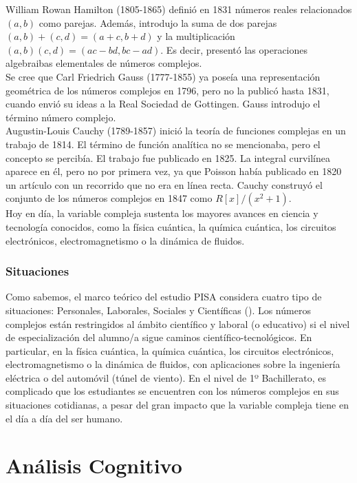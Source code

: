 \documentclass[../main.tex]{memoir}
\begin{document}
William Rowan Hamilton (1805-1865) definió en 1831 números reales relacionados $(a,b)$ como parejas. Además, introdujo la suma de dos parejas $(a,b) + (c,d) = (a+c,b+d)$ y la multiplicación $(a,b)(c,d) = (ac-bd,bc-ad)$. Es decir, presentó las operaciones algebraibas elementales de números complejos. \\

Se cree que Carl Friedrich Gauss (1777-1855) ya poseía una representación geométrica de los números complejos en 1796, pero no la publicó hasta 1831, cuando envió su ideas a la Real Sociedad de Gottingen. Gauss introdujo el término número complejo. \\

Augustin-Louis Cauchy (1789-1857) inició la teoría de funciones complejas en un trabajo de 1814. El término de función analítica no se mencionaba, pero el concepto se percibía. El trabajo fue publicado en 1825. La integral curvilínea aparece en él, pero no por primera vez, ya que Poisson había publicado en 1820 un artículo con un recorrido que no era en línea recta. Cauchy construyó el conjunto de los números complejos en 1847 como $R[x]/(x^2+1)$. \\

Hoy en día, la variable compleja sustenta los mayores avances en ciencia y tecnología conocidos, como la física cuántica, la química cuántica, los circuitos electrónicos, electromagnetismo o la  dinámica de fluidos.


\subsubsection{Situaciones}

Como sabemos, el marco teórico del estudio PISA considera cuatro tipo de situaciones: Personales, Laborales, Sociales y Científicas (\cite{estudiopisa}). Los números complejos están restringidos al ámbito científico y laboral (o educativo) si el nivel de especialización del alumno/a sigue caminos científico-tecnológicos. En particular, en la física cuántica, la química cuántica, los circuitos electrónicos, electromagnetismo o la dinámica de fluidos, con aplicaciones sobre la ingeniería eléctrica o del automóvil (túnel de viento). En el nivel de 1º Bachillerato, es complicado que los estudiantes se encuentren con los números complejos en sus situaciones cotidianas, a pesar del gran impacto que la variable compleja tiene en el día a día del ser humano.


\section{Análisis Cognitivo}
\end{document}
